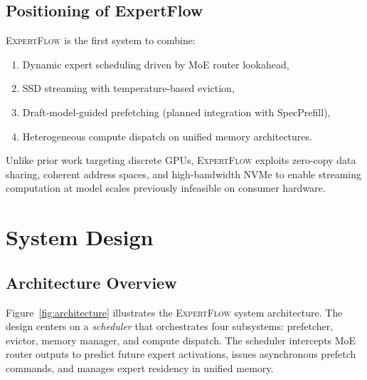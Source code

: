 \documentclass[11pt]{article}
\begin{document}
\subsection{Positioning of ExpertFlow}

\textsc{ExpertFlow} is the first system to combine:
\begin{enumerate}
    \item Dynamic expert scheduling driven by MoE router lookahead,
    \item SSD streaming with temperature-based eviction,
    \item Draft-model-guided prefetching (planned integration with SpecPrefill),
    \item Heterogeneous compute dispatch on unified memory architectures.
\end{enumerate}

Unlike prior work targeting discrete GPUs, \textsc{ExpertFlow} exploits zero-copy data sharing, coherent address spaces, and high-bandwidth NVMe to enable streaming computation at model scales previously infeasible on consumer hardware.

\section{System Design}
\label{sec:design}

\subsection{Architecture Overview}

Figure~\ref{fig:architecture} illustrates the \textsc{ExpertFlow} system architecture. The design centers on a \textit{scheduler} that orchestrates four subsystems: prefetcher, evictor, memory manager, and compute dispatch. The scheduler intercepts MoE router outputs to predict future expert activations, issues asynchronous prefetch commands, and manages expert residency in unified memory.
\end{document}
